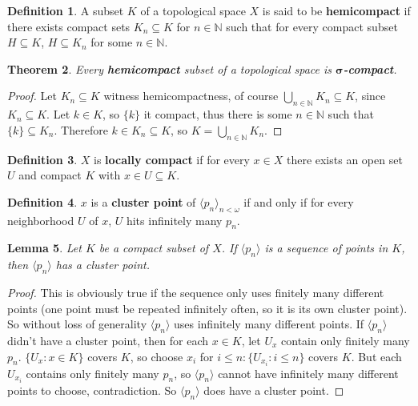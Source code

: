 \documentclass{amsart}
\theoremstyle{plain}
\newtheorem{theorem}{Theorem}
\newtheorem{lemma}[theorem]{Lemma}
\theoremstyle{definition}
\newtheorem{definition}[theorem]{Definition}
\theoremstyle{remark}
\begin{document}
	\begin{definition}
	  A subset \(K\) of a topological space \(X\) is said to be \textbf{hemicompact} if there exists compact sets $K_n \subseteq K$ for $n \in \mathbb{N}$ such that for every compact subset \(H\subseteq K\), \(H\subseteq K_n\) for some \(n\in\mathbb N\). \cite{Clontz2015}
	\end{definition}

	\begin{theorem}
		Every \textbf{hemicompact} subset of a topological space is \(\boldsymbol{\sigma}\)\textbf{-compact}.
	\end{theorem}
	\begin{proof}
		Let $K_n \subseteq K$ witness hemicompactness, of course $\underset{n \in \mathbb{N}}{\bigcup}K_n \subseteq K$, since $K_n \subseteq K$. Let $k \in K$, so $\lbrace k \rbrace$ it compact, thus there is some $n \in \mathbb{N}$ such that $\lbrace k \rbrace \subseteq K_n$. Therefore $k \in K_n \subseteq K$, so $K = \underset{n \in \mathbb{N}}{\bigcup}K_n$.
	\end{proof}

	\begin{definition}
		$X$ is \textbf{locally compact} if for every $x \in X$ there exists an open set $U$ and compact $K$ with $x \in U \subseteq K$. \cite{Clontz2010}
	\end{definition}
	
	\begin{definition}
		$x$ is a \textbf{cluster point} of $\langle p_n \rangle_{n < \omega}$ if and only if for every neighborhood $U$ of $x$, $U$ hits infinitely many $p_n$.
	\end{definition}

	\begin{lemma}
	Let $K$ be a compact subset of $X$. If $\langle p_n \rangle$ is a sequence of points in $K$, then $\langle p_n \rangle$ has a cluster point.
	\end{lemma}
	\begin{proof}
	This is obviously true if the sequence only uses finitely many different points (one point must be repeated infinitely often, so it is its own cluster point). So without loss of generality $\langle p_n \rangle$ uses infinitely many different points. If $\langle p_n \rangle$ didn't have a cluster point, then for each $x \in K$, let $U_x$ contain only finitely many $p_n$. $\lbrace U_x : x \in K \rbrace$ covers $K$, so choose $x_i$ for $i \leq n : \lbrace U_{x_i} : i \leq n \rbrace$ covers $K$. But each $U_{x_i}$ contains only finitely many $p_n$, so $\langle p_n \rangle$ cannot have infinitely many different points to choose, contradiction. So $\langle p_n \rangle$ does have a cluster point.
	\end{proof}
\end{document}
